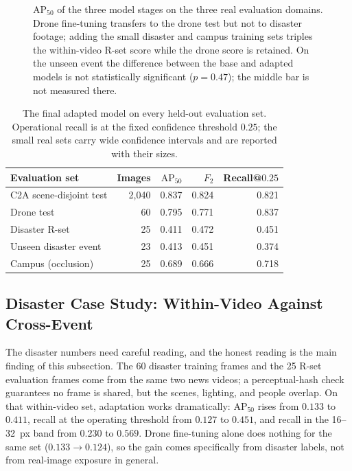 \begin{figure}[tbp]
  \centering
  \caption{$\mathrm{AP}_{50}$ of the three model stages on the three real
  evaluation domains. Drone fine-tuning transfers to the drone test but not to
  disaster footage; adding the small disaster and campus training sets triples
  the within-video R-set score while the drone score is retained. On the unseen
  event the difference between the base and adapted models is not statistically
  significant ($p=0.47$); the middle bar is not measured there.}
  \label{fig:sim2real}
\end{figure}

\begin{table}[tbp]
  \centering
  \caption{The final adapted model on every held-out evaluation set. Operational
  recall is at the fixed confidence threshold $0.25$; the small real sets carry
  wide confidence intervals and are reported with their sizes.}
  \label{tab:multidomain}
  \begin{tabular}{@{}l r r r r@{}}
    \toprule
    Evaluation set & Images & $\mathrm{AP}_{50}$ & $F_2$ & Recall@$0.25$ \\
    \midrule
    C2A scene-disjoint test   & 2{,}040 & 0.837 & 0.824 & 0.821 \\
    Drone test                & 60      & 0.795 & 0.771 & 0.837 \\
    Disaster R-set            & 25      & 0.411 & 0.472 & 0.451 \\
    Unseen disaster event     & 23      & 0.413 & 0.451 & 0.374 \\
    Campus (occlusion)        & 25      & 0.689 & 0.666 & 0.718 \\
    \bottomrule
  \end{tabular}
\end{table}

\subsection{Disaster Case Study: Within-Video Against Cross-Event}
\label{sec:xevent}
The disaster numbers need careful reading, and the honest reading is the main
finding of this subsection. The 60 disaster training frames and the 25 R-set
evaluation frames come from the same two news videos; a perceptual-hash check
guarantees no frame is shared, but the scenes, lighting, and people overlap. On
that within-video set, adaptation works dramatically: $\mathrm{AP}_{50}$ rises
from $0.133$ to $0.411$, recall at the operating threshold from $0.127$ to
$0.451$, and recall in the 16--32~px band from $0.230$ to $0.569$. Drone
fine-tuning alone does nothing for the same set ($0.133 \to 0.124$), so the gain
comes specifically from disaster labels, not from real-image exposure in
general.

